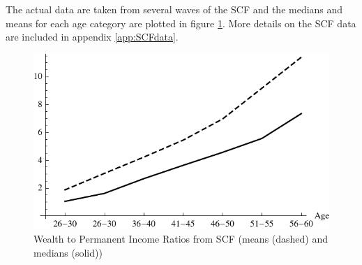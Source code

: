 \documentclass[titlepage]{\econtex}
\begin{document}

  The actual data are taken from several waves of the SCF and the medians and means for each age category are plotted in figure \ref{fig:MeanMedianSCF}. More details on the SCF data are included in appendix \ref{app:SCFdata}.
  \hypertarget{PlotMeanMedianSCFcollegeGrads}{}
  \begin{figure}
    \includegraphics{./Figures/PlotMeanMedianSCFcollegeGrads}
    \caption{Wealth to Permanent Income Ratios from SCF (means (dashed) and medians (solid))}
    \label{fig:MeanMedianSCF}
  \end{figure}
\end{document}
